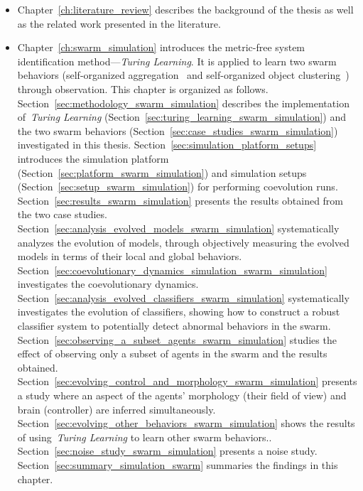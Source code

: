 \begin{itemize}
\item Chapter~\ref{ch:literature_review} describes the background of the thesis as well as the related work presented in the literature. 

\item Chapter~\ref{ch:swarm_simulation} introduces the metric-free system identification method---\textit{Turing Learning}. It is applied to learn two swarm behaviors (self-organized aggregation~\cite{Gauci2014_ijrr} and self-organized object clustering~\cite{Melvin2014_aamas}) through observation. This chapter is organized as follows. Section~\ref{sec:methodology_swarm_simulation} describes the implementation of~\textit{Turing Learning} (Section~\ref{sec:turing_learning_swarm_simulation}) and the two swarm behaviors (Section~\ref{sec:case_studies_swarm_simulation}) investigated in this thesis. Section~\ref{sec:simulation_platform_setups} introduces the simulation platform (Section~\ref{sec:platform_swarm_simulation}) and simulation setups (Section~\ref{sec:setup_swarm_simulation}) for performing coevolution runs. Section~\ref{sec:results_swarm_simulation} presents the results obtained from the two case studies. Section~\ref{sec:analysis_evolved_models_swarm_simulation} systematically analyzes the evolution of models, through objectively measuring the evolved models in terms of their local and global behaviors. Section~\ref{sec:coevolutionary_dynamics_simulation_swarm_simulation} investigates the coevolutionary dynamics. Section~\ref{sec:analysis_evolved_classifiers_swarm_simulation} systematically investigates the evolution of classifiers, showing how to construct a robust classifier system to potentially detect abnormal behaviors in the swarm. Section~\ref{sec:observing_a_subset_agents_swarm_simulation} studies the effect of observing only a subset of agents in the swarm and the results obtained. Section~\ref{sec:evolving_control_and_morphology_swarm_simulation} presents a study where an aspect of the agents' morphology (their field of view) and brain (controller) are inferred simultaneously. Section~\ref{sec:evolving_other_behaviors_swarm_simulation} shows the results of using~\textit{Turing Learning} to learn other swarm behaviors.. Section~\ref{sec:noise_study_swarm_simulation} presents a noise study. Section~\ref{sec:summary_simulation_swarm} summaries the findings in this chapter.


\end{itemize}
